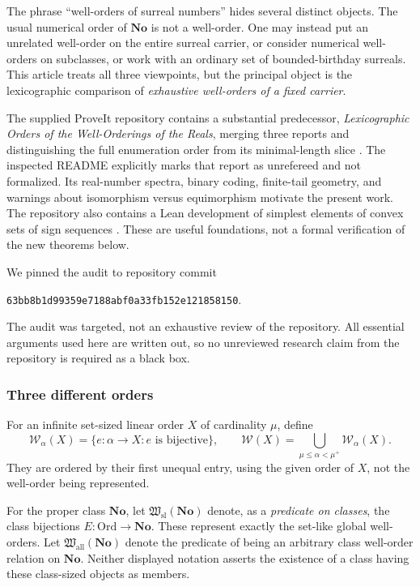 \documentclass[11pt]{article}
\theoremstyle{definition}
\theoremstyle{remark}
\newcommand{\No}{\mathbf{No}}
\newcommand{\Ord}{\mathrm{Ord}}
\newcommand{\WO}{\mathcal W}
\newcommand{\Hsl}{\mathfrak W_{\mathrm{sl}}}
\newcommand{\Hall}{\mathfrak W_{\mathrm{all}}}
\begin{document}
The phrase ``well-orders of surreal numbers'' hides several distinct
objects. The usual numerical order of $\No$ is not a well-order. One may
instead put an unrelated well-order on the entire surreal carrier, or
consider numerical well-orders on subclasses, or work with an ordinary
set of bounded-birthday surreals. This article treats all three viewpoints,
but the principal object is the lexicographic comparison of
\emph{exhaustive well-orders of a fixed carrier}.

The supplied ProveIt repository contains a substantial predecessor,
\emph{Lexicographic Orders of the Well-Orderings of the Reals}, merging
three reports and distinguishing the full enumeration order from its
minimal-length slice \cite{ProveItReals}. The inspected README explicitly
marks that report as unrefereed and not formalized. Its real-number
spectra, binary coding, finite-tail geometry, and warnings about
isomorphism versus equimorphism motivate the present work. The repository
also contains a Lean development of simplest elements of convex sets of
sign sequences \cite{ProveItSimplicity}. These are useful foundations, not a
formal verification of the new theorems below.

We pinned the audit to repository commit
\begin{center}
\small\texttt{63bb8b1d99359e7188abf0a33fb152e121858150}.
\end{center}
The audit was targeted, not an exhaustive review of the repository.
All essential arguments used here are written out, so no unreviewed
research claim from the repository is required as a black box.

\subsubsection{Three different orders}

For an infinite set-sized linear order $X$ of cardinality $\mu$, define
\[
 \WO_\alpha(X)=\{e:\alpha\longrightarrow X:e\text{ is bijective}\},
 \qquad
 \WO(X)=\bigcup_{\mu\leq\alpha<\mu^+}\WO_\alpha(X).
\]
They are ordered by their first unequal entry, using the given order of
$X$, not the well-order being represented.

For the proper class $\No$, let $\Hsl(\No)$ denote, as a \emph{predicate on
classes}, the class bijections $E:\Ord\to\No$. These represent exactly the
set-like global well-orders. Let $\Hall(\No)$ denote the predicate
of being an arbitrary class well-order relation on $\No$.
Neither displayed notation asserts the existence of a class having these
class-sized objects as members.
\end{document}
